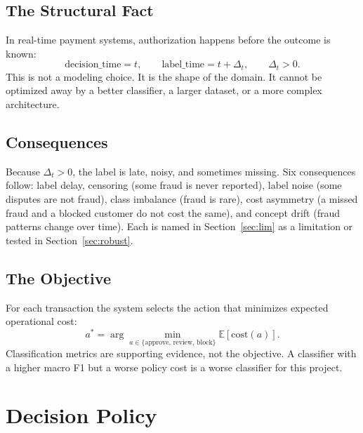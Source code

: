 \documentclass[conference]{IEEEtran}
\begin{document}
\subsection{The Structural Fact}

In real-time payment systems, authorization happens before the outcome is
known:
\begin{equation}
\text{decision\_time} = t, \qquad \text{label\_time} = t + \Delta_t,
\qquad \Delta_t > 0 .
\end{equation}
This is not a modeling choice. It is the shape of the domain. It cannot be
optimized away by a better classifier, a larger dataset, or a more complex
architecture.

\subsection{Consequences}

Because $\Delta_t > 0$, the label is late, noisy, and sometimes missing. Six
consequences follow: label delay, censoring (some fraud is never reported),
label noise (some disputes are not fraud), class imbalance (fraud is rare),
cost asymmetry (a missed fraud and a blocked customer do not cost the same),
and concept drift (fraud patterns change over time). Each is named in
Section~\ref{sec:lim} as a limitation or tested in
Section~\ref{sec:robust}.

\subsection{The Objective}

For each transaction the system selects the action that minimizes expected
operational cost:
\begin{equation}
a^* = \arg\min_{a \in \{\text{approve, review, block}\}}
\mathbb{E}[\text{cost}(a)] .
\end{equation}
Classification metrics are supporting evidence, not the objective. A
classifier with a higher macro F1 but a worse policy cost is a worse
classifier for this project.

\section{Decision Policy}
\label{sec:policy}
\end{document}
